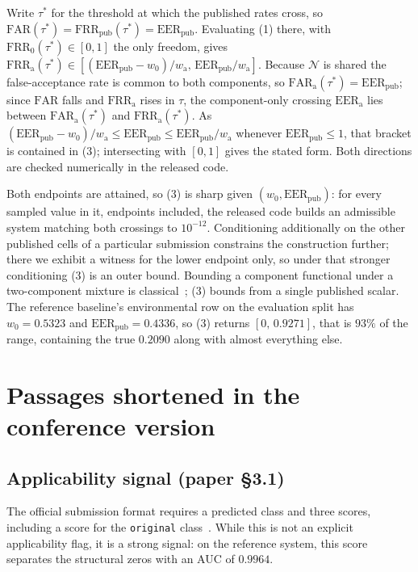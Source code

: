 \documentclass[10pt]{article}
\begin{document}
\noindent Write $\tau^\ast$ for the threshold at which the published rates cross, so
$\mathrm{FAR}(\tau^\ast) = \mathrm{FRR}_{\text{pub}}(\tau^\ast) = \mathrm{EER}_{\text{pub}}$. Evaluating
(1) there, with $\mathrm{FRR}_0(\tau^\ast) \in [0,1]$ the only freedom, gives
$\mathrm{FRR}_{\mathrm{a}}(\tau^\ast) \in [(\mathrm{EER}_{\text{pub}} - w_0)/w_{\mathrm{a}},\,
\mathrm{EER}_{\text{pub}}/w_{\mathrm{a}}]$. Because $\mathcal{N}$ is shared the false-acceptance
rate is common to both components, so $\mathrm{FAR}_{\mathrm{a}}(\tau^\ast) =
\mathrm{EER}_{\text{pub}}$; since $\mathrm{FAR}$ falls and $\mathrm{FRR}_{\mathrm{a}}$ rises in $\tau$, the component-only crossing $\mathrm{EER}_{\mathrm{a}}$ lies between
$\mathrm{FAR}_{\mathrm{a}}(\tau^\ast)$ and $\mathrm{FRR}_{\mathrm{a}}(\tau^\ast)$. As
$(\mathrm{EER}_{\text{pub}} - w_0)/w_{\mathrm{a}} \le \mathrm{EER}_{\text{pub}} \le
\mathrm{EER}_{\text{pub}}/w_{\mathrm{a}}$ whenever $\mathrm{EER}_{\text{pub}} \le 1$, that bracket
is contained in (3); intersecting with $[0,1]$ gives the stated form. Both
directions are checked numerically in the released code.

Both endpoints are attained, so (3) is sharp given $(w_0,\mathrm{EER}_{\text{pub}})$:
for every sampled value in it, endpoints included, the released code builds an admissible system
matching both crossings to $10^{-12}$. Conditioning additionally on the other published cells of a
particular submission constrains the construction further; there we exhibit a witness for the lower
endpoint only, so under that stronger conditioning (3) is an outer bound. Bounding a component functional
under a two-component mixture is classical~\cite{horowitz1995}; (3) bounds from a
single published scalar. The reference baseline's environmental row on the evaluation split
has $w_0=0.5323$ and $\mathrm{EER}_{\text{pub}}=0.4336$, so (3) returns
$[0,\,0.9271]$, that is $93\%$ of the range, containing the true $0.2090$ along with almost
everything else.

\section{Passages shortened in the conference version}

\subsection*{Applicability signal (paper \S3.1)}

The official submission format requires a predicted class and three scores, including a
score for the \texttt{original} class~\cite{esdd2plan}. While this is not an explicit
applicability flag, it is a strong signal: on the reference system, this
score separates the structural zeros with an AUC of $0.9964$.
\end{document}
